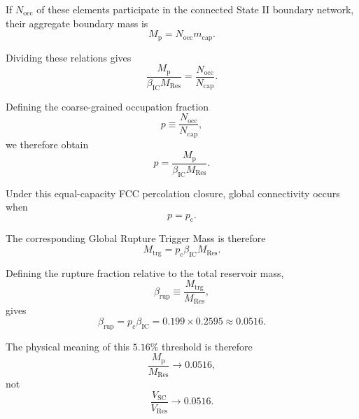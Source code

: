 If \(N_{\mathrm{occ}}\) of these elements participate in the connected State
II boundary network, their aggregate boundary mass is
\begin{equation}
    M_{\mathrm p}
    =
    N_{\mathrm{occ}}
    m_{\mathrm{cap}}.
\end{equation}

Dividing these relations gives
\begin{equation}
    \frac{
        M_{\mathrm p}
    }{
        \beta_{\mathrm{IC}}
        M_{\mathrm{Res}}
    }
    =
    \frac{
        N_{\mathrm{occ}}
    }{
        N_{\mathrm{cap}}
    }.
\end{equation}

Defining the coarse-grained occupation fraction
\begin{equation}
    p
    \equiv
    \frac{
        N_{\mathrm{occ}}
    }{
        N_{\mathrm{cap}}
    },
\end{equation}
we therefore obtain
\begin{equation}
    p
    =
    \frac{
        M_{\mathrm p}
    }{
        \beta_{\mathrm{IC}}
        M_{\mathrm{Res}}
    }.
\end{equation}

Under this equal-capacity FCC percolation closure, global connectivity occurs
when
\begin{equation}
    p
    =
    p_{\mathrm c}.
\end{equation}

The corresponding Global Rupture Trigger Mass is therefore
\begin{equation}
    \boxed{
    M_{\mathrm{trg}}
    =
    p_{\mathrm c}
    \beta_{\mathrm{IC}}
    M_{\mathrm{Res}}.
    }
\end{equation}

Defining the rupture fraction relative to the total reservoir mass,
\begin{equation}
    \beta_{\mathrm{rup}}
    \equiv
    \frac{
        M_{\mathrm{trg}}
    }{
        M_{\mathrm{Res}}
    },
\end{equation}
gives
\begin{equation}
    \beta_{\mathrm{rup}}
    =
    p_{\mathrm c}
    \beta_{\mathrm{IC}}
    =
    0.199
    \times
    0.2595
    \approx
    0.0516.
\end{equation}

The physical meaning of this \(5.16\%\) threshold is therefore
\begin{equation}
    \frac{
        M_{\mathrm p}
    }{
        M_{\mathrm{Res}}
    }
    \rightarrow
    0.0516,
\end{equation}
not
\begin{equation}
    \frac{
        V_{\mathrm{SC}}
    }{
        V_{\mathrm{Res}}
    }
    \rightarrow
    0.0516.
\end{equation}

